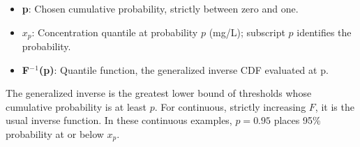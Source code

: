 \documentclass[11pt,a4paper]{article}
\begin{document}
\begin{minipage}{\linewidth}
\begin{itemize}\setlength{\itemsep}{1pt}\setlength{\parsep}{0pt}
\item \textbf{p}: Chosen cumulative probability, strictly between zero and one.
\item \textbf{\(x_p\)}: Concentration quantile at probability \(p\) (mg/L); subscript \(p\) identifies the probability.
\item \textbf{F\ensuremath{{}^-}\ensuremath{{}^1}(p)}: Quantile function, the generalized inverse CDF evaluated at p.
\end{itemize}

The generalized inverse is the greatest lower bound of thresholds whose cumulative probability is at least \(p\). For continuous, strictly increasing \(F\), it is the usual inverse function. In these continuous examples, \(p = 0.95\) places 95\% probability at or below \(x_p\).

\end{minipage}\par
\medskip
\end{document}
